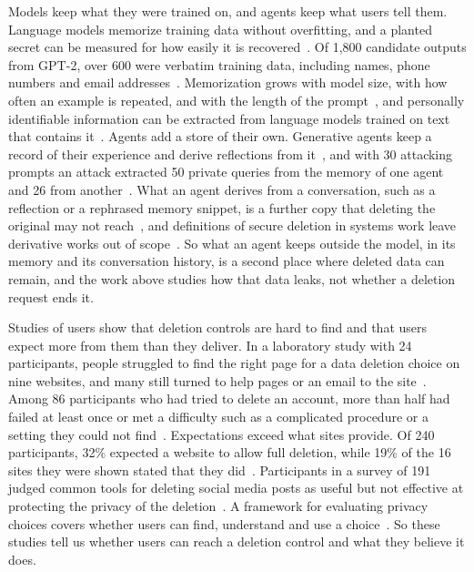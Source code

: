 Models keep what they were trained on, and agents keep what users tell them. Language models memorize training data without overfitting, and a planted secret can be measured for how easily it is recovered~\cite{carlini2019secret}. Of 1,800 candidate outputs from GPT-2, over 600 were verbatim training data, including names, phone numbers and email addresses~\cite{carlini2021extracting}. Memorization grows with model size, with how often an example is repeated, and with the length of the prompt~\cite{carlini2023quantifying}, and personally identifiable information can be extracted from language models trained on text that contains it~\cite{lukas2023analyzing}. Agents add a store of their own. Generative agents keep a record of their experience and derive reflections from it~\cite{park2023generative}, and with 30 attacking prompts an attack extracted 50 private queries from the memory of one agent and 26 from another~\cite{wang2025unveiling}. What an agent derives from a conversation, such as a reflection or a rephrased memory snippet, is a further copy that deleting the original may not reach~\cite{park2023generative,li2026privacy}, and definitions of secure deletion in systems work leave derivative works out of scope~\cite{reardon2013sok}. So what an agent keeps outside the model, in its memory and its conversation history, is a second place where deleted data can remain, and the work above studies how that data leaks, not whether a deletion request ends it.

Studies of users show that deletion controls are hard to find and that users expect more from them than they deliver. In a laboratory study with 24 participants, people struggled to find the right page for a data deletion choice on nine websites, and many still turned to help pages or an email to the site~\cite{habib2020scavenger}. Among 86 participants who had tried to delete an account, more than half had failed at least once or met a difficulty such as a complicated procedure or a setting they could not find~\cite{bumiller2026zombies}. Expectations exceed what sites provide. Of 240 participants, 32\% expected a website to allow full deletion, while 19\% of the 16 sites they were shown stated that they did~\cite{rao2016expecting}. Participants in a survey of 191 judged common tools for deleting social media posts as useful but not effective at protecting the privacy of the deletion~\cite{minaei2022deletion}. A framework for evaluating privacy choices covers whether users can find, understand and use a choice~\cite{habib2022evaluating}. So these studies tell us whether users can reach a deletion control and what they believe it does.

